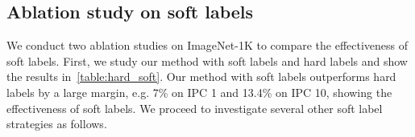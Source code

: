 \documentclass[10pt,twocolumn,letterpaper]{article}
\begin{document}
\begin{table}
\centering
{}
\caption{Test accuracy of different methods on ConvNet versus transferred to other architectures. All methods are evaluated with 10 IPCs.}
\label{table:transfer}
\end{table}
\subsection{Ablation study on soft labels}
\label{sec.ablation}
We conduct two ablation studies on ImageNet-1K to compare the effectiveness of soft labels.
First, we study our method with soft labels and hard labels and show the results in~\cref{table:hard_soft}. Our method with soft labels outperforms hard labels by a large margin, e.g. 7\% on IPC 1 and 13.4\% on IPC 10, showing the effectiveness of soft labels.
We proceed to investigate several other soft label strategies as follows.
\end{document}
